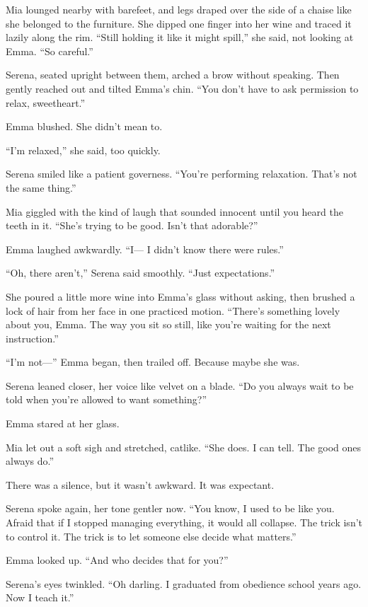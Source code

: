 Mia lounged nearby with barefeet, and legs draped over the side of a chaise like she belonged to the furniture.
She dipped one finger into her wine and traced it lazily along the rim.
``Still holding it like it might spill,'' she said, not looking at Emma. ``So careful.''

Serena, seated upright between them, arched a brow without speaking. Then gently reached out and 
tilted Emma’s chin.
``You don’t have to ask permission to relax, sweetheart.''

Emma blushed. She didn’t mean to.

``I’m relaxed,'' she said, too quickly.

Serena smiled like a patient governess. ``You’re performing relaxation. That's not the same thing.''

Mia giggled with the kind of laugh that sounded innocent until you heard the teeth in it.
``She’s trying to be good. Isn’t that adorable?''

Emma laughed awkwardly. ``I— I didn’t know there were rules.''

``Oh, there aren’t,'' Serena said smoothly. ``Just expectations.''

She poured a little more wine into Emma’s glass without asking, then brushed a lock of hair from her 
face in one practiced motion.
``There’s something lovely about you, Emma. The way you sit so still, like you’re waiting for the 
next instruction.''

``I’m not—'' Emma began, then trailed off. Because maybe she was.

Serena leaned closer, her voice like velvet on a blade.
``Do you always wait to be told when you’re allowed to want something?''

Emma stared at her glass.

Mia let out a soft sigh and stretched, catlike. ``She does. I can tell. The good ones always do.''

There was a silence, but it wasn’t awkward. It was expectant.

Serena spoke again, her tone gentler now. ``You know, I used to be like you. Afraid that if I stopped 
managing everything, it would all collapse. The trick isn’t to control it. The trick is to let someone 
else decide what matters.''

Emma looked up. ``And who decides that for you?''

Serena’s eyes twinkled. ``Oh darling. I graduated from obedience school years ago. Now I teach it.''

